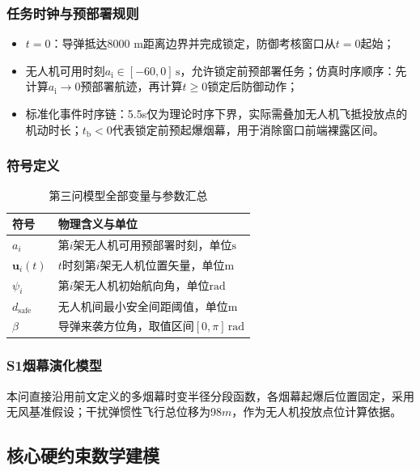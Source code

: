\documentclass[withoutpreface,bwprint]{cumcmthesis}
\renewcommand{\textbf}[1]{{\song\bfseries #1}}
\begin{document}
\subsubsection{任务时钟与预部署规则}
\begin{itemize}
	\item $t=0$：导弹抵达8000 m距离边界并完成锁定，防御考核窗口从$t=0$起始；
	\item 无人机可用时刻$a_{\mathrm{i}}\in[-60,0]\,\text{s}$，允许锁定前预部署任务；仿真时序顺序：先计算$a_{\mathrm{i}}\to0$预部署航迹，再计算$t\ge0$锁定后防御动作；
	\item 标准化事件时序链：5.5s仅为理论时序下界，实际需叠加无人机飞抵投放点的机动时长；$t_{\mathrm{b}}<0$代表锁定前预起爆烟幕，用于消除窗口前端裸露区间。
\end{itemize}


\subsubsection{符号定义}
\begin{table}[htbp]
	\centering
	\caption{第三问模型全部变量与参数汇总}
	\label{tab:q3_symbol_table}
	\begin{tabularx}{\textwidth}{l l}
		\toprule
		\textbf{符号} & \textbf{物理含义与单位} \\
		\midrule
		$a_i$ & 第$i$架无人机可用预部署时刻，单位$\mathrm{s}$ \\
		$\bm{u}_i(t)$ & $t$时刻第$i$架无人机位置矢量，单位$\mathrm{m}$ \\
		$\psi_i$ & 第$i$架无人机初始航向角，单位$\mathrm{rad}$ \\
		$d_{\text{safe}}$ & 无人机间最小安全间距阈值，单位$\mathrm{m}$ \\
		$\beta$ & 导弹来袭方位角，取值区间$[0,\pi]\,\mathrm{rad}$ \\
		\bottomrule
	\end{tabularx}
\end{table}


\subsubsection{S1烟幕演化模型}
本问直接沿用前文定义的多烟幕时变半径分段函数，各烟幕起爆后位置固定，采用无风基准假设；干扰弹惯性飞行总位移为98\(m\)，作为无人机投放点位计算依据。


\subsection{核心硬约束数学建模}
\end{document}
